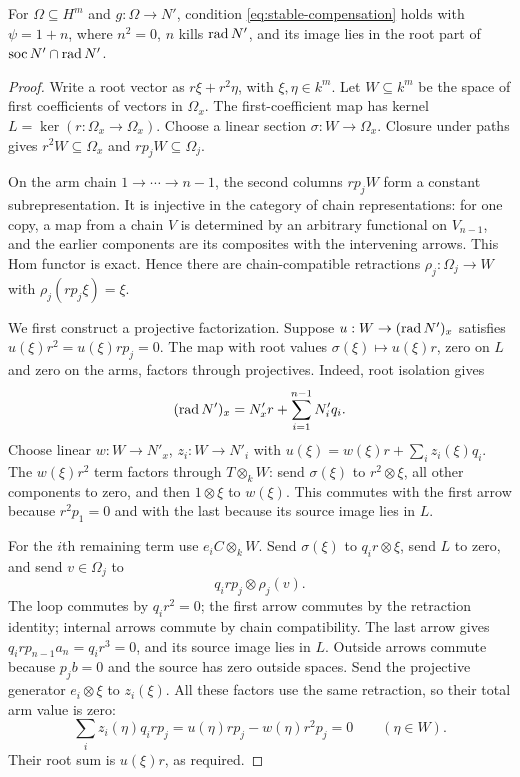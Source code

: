 \begin{lemma}\label{lem:isolated-compensation}
For $\Omega\subseteq H^m$ and $g:\Omega\to N'$, condition \eqref{eq:stable-compensation} holds with $\psi=1+n$, where $n^2=0$, $n$ kills $\operatorname{rad} N'$, and its image lies in the root part of $\operatorname{soc} N'\cap\operatorname{rad} N'$.
\end{lemma}
\begin{proof}
Write a root vector as $r\xi+r^2\eta$, with $\xi,\eta\in k^m$. Let $W\subseteq k^m$ be the space of first coefficients of vectors in $\Omega_x$. The first-coefficient map has kernel $L=\ker(r:\Omega_x\to\Omega_x)$. Choose a linear section $\sigma:W\to\Omega_x$. Closure under paths gives $r^2W\subseteq\Omega_x$ and $rp_jW\subseteq\Omega_j$.

On the arm chain $1\to\cdots\to n-1$, the second columns $rp_jW$ form a constant subrepresentation. It is injective in the category of chain representations: for one copy, a map from a chain $V$ is determined by an arbitrary functional on $V_{n-1}$, and the earlier components are its composites with the intervening arrows. This Hom functor is exact. Hence there are chain-compatible retractions $\rho_j:\Omega_j\to W$ with $\rho_j(rp_j\xi)=\xi$.

We first construct a projective factorization. Suppose $u:W\to(\operatorname{rad} N')_x$ satisfies $u(\xi)r^2=u(\xi)rp_j=0$. The map with root values $\sigma(\xi)\mapsto u(\xi)r$, zero on $L$ and zero on the arms, factors through projectives. Indeed, root isolation gives
\[
 (\operatorname{rad} N')_x=N'_xr+\sum_{i=1}^{n-1}N'_iq_i.
\]
Choose linear $w:W\to N'_x$, $z_i:W\to N'_i$ with $u(\xi)=w(\xi)r+\sum_i z_i(\xi)q_i$. The $w(\xi)r^2$ term factors through $T\otimes_kW$: send $\sigma(\xi)$ to $r^2\otimes \xi$, all other components to zero, and then $1\otimes\xi$ to $w(\xi)$. This commutes with the first arrow because $r^2p_1=0$ and with the last because its source image lies in $L$.

For the $i$th remaining term use $e_iC\otimes_kW$. Send $\sigma(\xi)$ to $q_ir\otimes \xi$, send $L$ to zero, and send $v\in\Omega_j$ to
\[
 q_irp_j\otimes\rho_j(v).
\]
The loop commutes by $q_ir^2=0$; the first arrow commutes by the retraction identity; internal arrows commute by chain compatibility. The last arrow gives $q_irp_{n-1}a_n=q_ir^3=0$, and its source image lies in $L$. Outside arrows commute because $p_jb=0$ and the source has zero outside spaces. Send the projective generator $e_i\otimes\xi$ to $z_i(\xi)$. All these factors use the same retraction, so their total arm value is zero:
\[
 \sum_i z_i(\eta)q_irp_j=u(\eta)rp_j-w(\eta)r^2p_j=0\qquad(\eta\in W).
\]
Their root sum is $u(\xi)r$, as required.


\end{proof}
